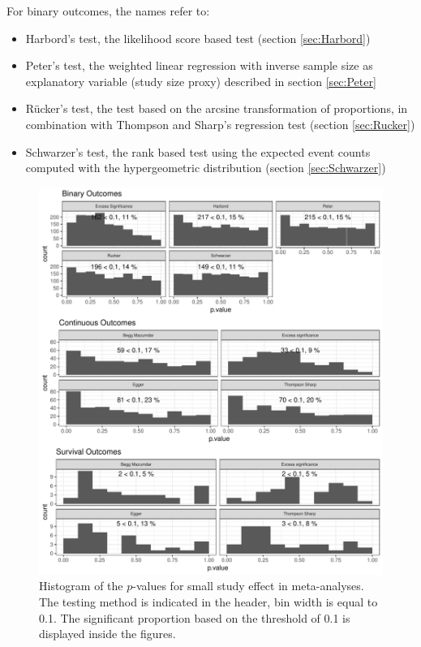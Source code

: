 For binary outcomes, the names refer to:
\begin{itemize}
\item Harbord's test, the likelihood score based test (section \ref{sec:Harbord})
\item Peter's test, the weighted linear regression with inverse sample size as explanatory variable (study size proxy) described in section \ref{sec:Peter}
\item R\"ucker's test, the test based on the arcsine transformation of proportions, in combination with Thompson and Sharp's regression test (section \ref{sec:Rucker})
\item Schwarzer's test, the rank based test using the expected event counts computed with the hypergeometric distribution (section \ref{sec:Schwarzer})
\end{itemize}

\begin{figure}
\begin{knitrout}
\color{fgcolor}

{\centering \includegraphics[width=\textwidth-3cm]{figure/ch03_figunnamed-chunk-2-1} 

}



\end{knitrout}
\caption{Histogram of the $p$-values for small study effect in meta-analyses. The testing method is indicated in the header, bin width is equal to 0.1. The significant proportion based on the threshold of 0.1 is displayed inside the figures.}
\label{fig:test}
\end{figure}

